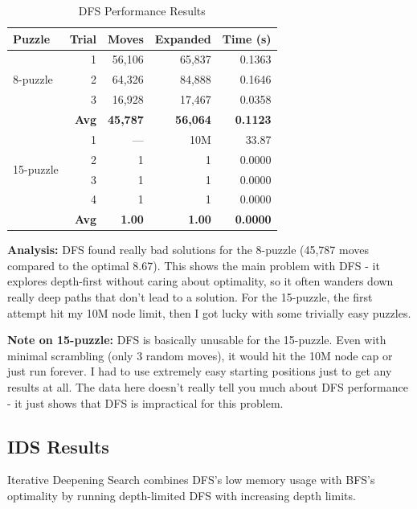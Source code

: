 \documentclass[letterpaper]{article}
\begin{document}
\begin{table}[h]
\centering
\tiny
\begin{tabular}{lrrrr}
\toprule
\textbf{Puzzle} & \textbf{Trial} & \textbf{Moves} & \textbf{Expanded} & \textbf{Time (s)} \\
\midrule
\multirow{3}{*}{8-puzzle} & 1 & 56,106 & 65,837 & 0.1363 \\
& 2 & 64,326 & 84,888 & 0.1646 \\
& 3 & 16,928 & 17,467 & 0.0358 \\
\cmidrule{2-5}
& \textbf{Avg} & \textbf{45,787} & \textbf{56,064} & \textbf{0.1123} \\
\midrule
\multirow{4}{*}{15-puzzle} & 1 & --- & 10M & 33.87 \\
& 2 & 1 & 1 & 0.0000 \\
& 3 & 1 & 1 & 0.0000 \\
& 4 & 1 & 1 & 0.0000 \\
\cmidrule{2-5}
& \textbf{Avg} & \textbf{1.00} & \textbf{1.00} & \textbf{0.0000} \\
\bottomrule
\end{tabular}
\caption{DFS Performance Results}
\end{table}

\textbf{Analysis:} DFS found really bad solutions for the 8-puzzle (45,787 moves compared to the optimal 8.67). This shows the main problem with DFS - it explores depth-first without caring about optimality, so it often wanders down really deep paths that don't lead to a solution. For the 15-puzzle, the first attempt hit my 10M node limit, then I got lucky with some trivially easy puzzles.

\textbf{Note on 15-puzzle:} DFS is basically unusable for the 15-puzzle. Even with minimal scrambling (only 3 random moves), it would hit the 10M node cap or just run forever. I had to use extremely easy starting positions just to get any results at all. The data here doesn't really tell you much about DFS performance - it just shows that DFS is impractical for this problem.

\subsection{IDS Results}

Iterative Deepening Search combines DFS's low memory usage with BFS's optimality by running depth-limited DFS with increasing depth limits.
\end{document}
